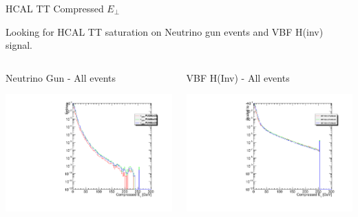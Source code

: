 \documentclass[8pt]{beamer}
\begin{document}
\begin{frame}{HCAL TT Compressed $E_{\perp}$}

Looking for HCAL TT saturation on Neutrino gun events and VBF H(inv) signal.

\begin{columns}
 
\begin{block}{Neutrino Gun - All events}
\centering

\includegraphics[width=\linewidth]{fig/HcalTT_Val_NG.pdf}

\end{block}

\begin{block}{VBF H(Inv) - All events}
\centering

\includegraphics[width=\linewidth]{fig/HcalTT_Val_Sig.pdf}


\end{block}
\end{columns}
\end{frame}
\end{document}
